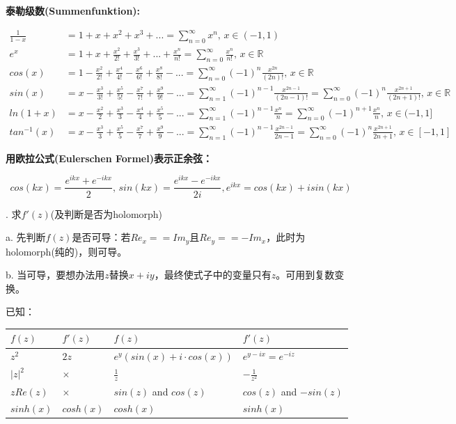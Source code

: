 \documentclass[fleqn]{article}
\begin{document}
\textbf{泰勒级数(Summenfunktion):}
\begin{center}
    $
        \begin{aligned}
            \frac{1}{1-x} &=1 + x + x^2 +x^3 +...=\sum_{n=0}^{\infty}x^n, \, x\in (-1,1)\\
            e^x &= 1+x+\frac{x^2}{2!}+\frac{x^3}{3!}+...+\frac{x^n}{n!} = \sum_{n=0}^{\infty}\frac{x^n}{n!}, \, x\in\mathbb{R}\\
            cos(x) &= 1-\frac{x^2}{2!}+\frac{x^4}{4!}-\frac{x^6}{6!}+\frac{x^8}{8!}-...=\sum_{n=0}^{\infty}(-1)^n\frac{x^{2n}}{(2n)!},\, x\in\mathbb{R}\\
            sin(x) &= x-\frac{x^3}{3!}+\frac{x^5}{5!}-\frac{x^7}{7!}+\frac{x^9}{9!}-...=\sum_{n=1}^{\infty}(-1)^{n-1}\frac{x^{2n-1}}{(2n-1)!}=\sum_{n=0}^{\infty}(-1)^{n}\frac{x^{2n+1}}{(2n+1)!},\, x\in\mathbb{R}\\
            ln(1+x)&= x-\frac{x^2}{2}+\frac{x^3}{3}-\frac{x^4}{4}+\frac{x^5}{5}-...=\sum_{n=1}^{\infty}(-1)^{n-1}\frac{x^n}{n}=\sum_{n=0}^{\infty}(-1)^{n+1}\frac{x^n}{n},\, x\in (-1,1]\\
            tan^{-1}(x)&= x-\frac{x^3}{3}+\frac{x^5}{5}-\frac{x^7}{7}+\frac{x^9}{9}-...=\sum_{n=1}^{\infty}(-1)^{n-1}\frac{x^{2n-1}}{2n-1}=\sum_{n=0}^{\infty}(-1)^{n}\frac{x^{2n+1}}{2n+1},\, x\in[-1,1]
        \end{aligned}
    $
\end{center}

\textbf{用欧拉公式(Eulerschen Formel)表示正余弦：}

$$cos(kx)=\frac{e^{ikx}+e^{-ikx}}{2},\, sin(kx)=\frac{e^{ikx}-e^{-ikx}}{2i},e^{ikx}=cos(kx)+isin(kx)$$



. 求$f'(z)$(及判断是否为holomorph)

a. 先判断$f(z)$是否可导：若$Re_x == Im_y$且$Re_y == -Im_x$，此时为holomorph(纯的)，则可导。

b. 当可导，要想办法用$z$替换$x+iy$，最终使式子中的变量只有$z$。可用到复数变换。

已知：
\begin{center}
    \begin{tabular}{l|l||l|l}
        $f(z)$&$f'(z)$&$f(z)$&$f'(z)$\\
        \hline
        $z^2$&$2z$&$e^y(sin(x)+i\cdot cos(x))$&$e^{y-ix}=e^{-iz}$\\
        \hline
        $|z|^2$&$\times$&$\frac{1}{z}$&$-\frac{1}{z^2}$\\
        \hline
        $zRe(z)$&$\times$&$sin(z)$ and $cos(z)$&$cos(z)$ and $-sin(z)$\\
        \hline
        $sinh(x)$&$cosh(x)$&$cosh(x)$&$sinh(x)$
    \end{tabular}
\end{center}
\end{document}
